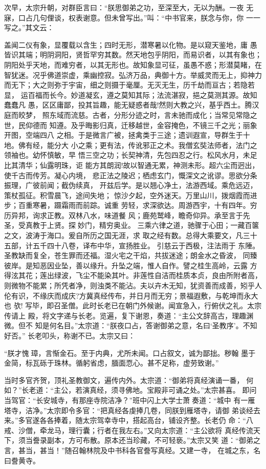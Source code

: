 次早，太宗升朝，对群臣言曰：“朕思御弟之功，至深至大，无以为酬。一夜
无寐，口占几句俚谈，权表谢意。但未曾写出。”叫：“中书官来，朕念与你，你
一一写之。”其文云：

盖闻二仪有象，显覆载以含生；四时无形，潜寒暑以化物。是以窥天鉴地，庸
愚皆识其端；明阴洞阳，贤哲罕穷其数。然天地包乎阴阳，而易识者，以其有象也；
阴阳处乎天地，而难穷者，以其无形也。故知象显可征，虽愚不惑；形潜莫睹，在
智犹迷。况乎佛道崇虚，乘幽控寂。弘济万品，典御十方。举威灵而无上，抑神力
而无下；大之则弥于宇宙，细之则摄于毫厘。无灭无生，历千劫而亘古；若隐若显，
运百福而长今。妙道凝玄，遵之莫知其际；法流湛寂，挹之莫测其源。故知蠢蠢凡
愚，区区庸鄙，投其旨趣，能无疑惑者哉!然则大教之兴，基乎西土。腾汉庭而皎梦，
照东域而流慈。古者，分形分迹之时，言未驰而成化；当常见常隐之世，民仰德而
知遵。及乎晦影归真，迁移越世，金容掩色，不镜三千之光；丽象开图，空端四八
之相。于是微言广被，拯禽类于三途；遗训遐宣，导群生于十地。佛有经，能分大
小之乘；更有法，传讹邪正之术。我僧玄奘法师者，法门之领袖也。幼怀慎敏，早
悟三空之功；长契神清，先包四忍之行。松风水月，未足比其清华；仙露明珠，讵
能方其朗润!故以智通无累，神测未形。超六尘而迥出，使千古而传芳。凝心内境，
悲正法之陵迟；栖虑玄门，慨深文之讹谬。思欲分条振理，广彼前闻；截伪续真，
开兹后学。是以翘心净土，法游西域。乘危远迈，策杖孤征。积雪晨飞，途间失地；
惊沙夕起，空外迷天。万里山川，拨烟霞而进步；百重寒暑，蹑霜雨而前踪。诚重
劳轻，求深欲达。周游西宇，十有四年。穷历异邦，询求正教。双林八水，味道餐
风；鹿苑鹫峰，瞻奇仰异。承至言于先圣，受真教于上贤。探妙门，精穷奥业。
三乘六律之道，驰骤于心田；一藏百箧之文，波涛于海口。爰自所历之国无涯，求
取之经有数。总得大乘要文，凡三十五部，计五千四十八卷，译布中华，宣扬胜业。
引慈云于西极，注法雨于
东陲。圣教缺而复全，苍生罪而还福。湿火宅之干焰，共拔迷途；朗金水之昏波，
同臻彼岸。是知恶因业坠，善以缘升。升坠之端，惟人自作。譬之桂生高岭，云露
方得泫其花；莲出绿波，飞尘不能染其叶。非莲性自洁而桂质本贞，良由所附者高，
则微物不能累；所凭者净，则浊类不能沾。夫以卉木无知，犹资善而成善，矧乎人
伦有识，不缘庆而成庆?方冀真经传布，并日月而无穷；景福遐敷，与乾坤而永大也
欤!
写毕，即召圣僧。此时长老已在朝门外候谢。闻宣急入，行俯伏之礼。太宗传请上
殿，将文字递与长老。览遍，复下谢恩，奏道：“主公文辞高古，理趣渊微。但不
知是何名目。”太宗道：“朕夜口占，答谢御弟之意，名曰‘圣教序’。不知好否。”
长老叩头，称谢不已。太宗又曰：

“朕才愧璋，言惭金石。至于内典，尤所未闻。口占叙文，诚为鄙拙。秽翰
墨于金简，标瓦砾于珠林。循躬省虑，腼面恧心。甚不足称，虚劳致谢。”

当时多官齐贺，顶礼圣教御文，遍传内外。太宗道：“御弟将真经演诵一番，
何如？”长老道：“主公，若演真经，须寻佛地。宝殿非可诵之处。”太宗甚喜。
即问当驾官：“长安城寺，有那座寺院洁净？”班中闪上大学士萧奏道：“城中
有一雁塔寺，洁净。”太宗即令多官：“把真经各虔捧几卷，同朕到雁塔寺，请御
弟谈经去来。”多官遂各各捧着，随太宗驾幸寺中，搭起高台，铺设齐整。长老仍
命：“八戒、沙僧，牵龙马，理行囊；行者在我左右。”又向太宗道：“主公欲将
真经传流天下，须当誊录副本，方可布散。原本还当珍藏，不可轻亵。”太宗又笑
道：“御弟之言，甚当，甚当！”随召翰林院及中书科各官誊写真经。又建一寺，
在城之东，名曰誊黄寺。

